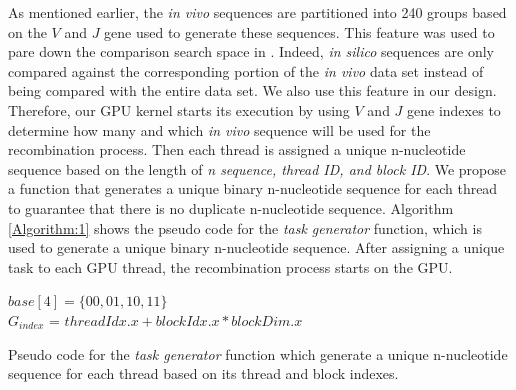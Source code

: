 
As mentioned earlier, the \emph{in vivo} sequences are partitioned into 240 groups based on the $V$ and $J$ gene used to generate these sequences. This feature was used to pare down the comparison search space in \cite{b2}. Indeed, \emph{in silico} sequences are only compared against the corresponding portion of the \emph{in vivo} data set instead of being compared with the entire data set. We also use this feature in our design. Therefore, our GPU kernel starts its execution by using $V$ and $J$ gene indexes to determine how many and which \emph{in vivo} sequence will be used for the recombination process. Then each thread is assigned a unique n-nucleotide sequence based on the length of \emph{n sequence, thread ID, and block ID}. We propose a function that generates a unique binary n-nucleotide sequence for each thread to guarantee that there is no duplicate n-nucleotide sequence. Algorithm \ref{Algorithm:1} shows the pseudo code for the \emph{task generator} function, which is used to generate a unique binary n-nucleotide sequence. After assigning a unique task to each GPU thread, the recombination process starts on the GPU.


\begin{algorithm}[t]
	$base[4] = \{00,01,10,11\} $\\
	$G_{index}$ = $threadIdx.x + blockIdx.x * blockDim.x$ \\
 \caption{Pseudo code for the \emph{task generator} function which generate a unique n-nucleotide sequence for each thread based on its thread and block indexes.}
\label{Algorithm:1}
\end{algorithm}


